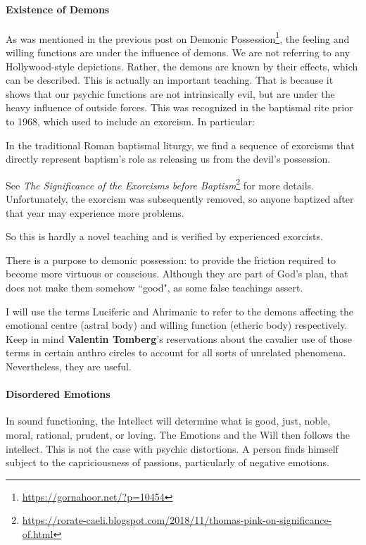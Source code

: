 \paragraph{Existence of Demons}
As was mentioned in the previous post on Demonic Possession\footnote{\url{https://gornahoor.net/?p=10454}}, the feeling and willing functions are under the influence of demons. We are not referring to any Hollywood-style depictions. Rather, the demons are known by their effects, which can be described. This is actually an important teaching. That is because it shows that our psychic functions are not intrinsically evil, but are under the heavy influence of outside forces. This was recognized in the baptismal rite prior to 1968, which used to include an exorcism. In particular:

\begin{quotex}
In the traditional Roman baptismal liturgy, we find a sequence of exorcisms that directly represent baptism's role as releasing us from the devil's possession. 

\end{quotex}
See \textit{The Significance of the Exorcisms before Baptism}\footnote{\url{https://rorate-caeli.blogspot.com/2018/11/thomas-pink-on-significance-of.html}} for more details. Unfortunately, the exorcism was subsequently removed, so anyone baptized after that year may experience more problems.

So this is hardly a novel teaching and is verified by experienced exorcists.

There is a purpose to demonic possession: to provide the friction required to become more virtuous or conscious. Although they are part of God's plan, that does not make them somehow ``good", as some false teachings assert.

I will use the terms Luciferic and Ahrimanic to refer to the demons affecting the emotional centre (astral body) and willing function (etheric body) respectively. Keep in mind \textbf{Valentin Tomberg}'s reservations about the cavalier use of those terms in certain anthro circles to account for all sorts of unrelated phenomena. Nevertheless, they are useful.

\paragraph{Disordered Emotions}
In sound functioning, the Intellect will determine what is good, just, noble, moral, rational, prudent, or loving. The Emotions and the Will then follows the intellect. This is not the case with psychic distortions. A person finds himself subject to the capriciousness of passions, particularly of negative emotions.

